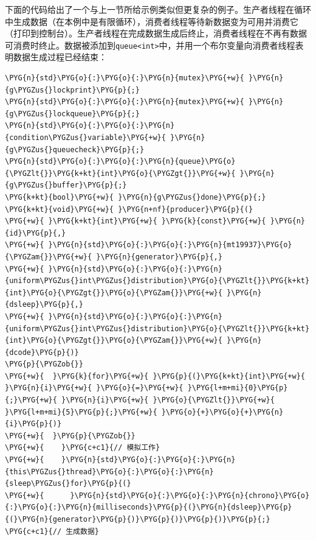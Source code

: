 
下面的代码给出了一个与上一节所给示例类似但更复杂的例子。生产者线程在循环中生成数据（在本例中是有限循环），消费者线程等待新数据变为可用并消费它（打印到控制台）。生产者线程在完成数据生成后终止，消费者线程在不再有数据可消费时终止。数据被添加到\texttt{queue<\allowbreak{}int>}中，并用一个布尔变量向消费者线程表明数据生成过程已经结束：



\begin{codeblockbg}
\begin{Verbatim}[commandchars=\\\{\},breaklines=true,breakanywhere=true,fontsize=\codefont,xleftmargin=17bp]
\PYG{n}{std}\PYG{o}{:}\PYG{o}{:}\PYG{n}{mutex}\PYG{+w}{ }\PYG{n}{g\PYGZus{}lockprint}\PYG{p}{;}
\PYG{n}{std}\PYG{o}{:}\PYG{o}{:}\PYG{n}{mutex}\PYG{+w}{ }\PYG{n}{g\PYGZus{}lockqueue}\PYG{p}{;}
\PYG{n}{std}\PYG{o}{:}\PYG{o}{:}\PYG{n}{condition\PYGZus{}variable}\PYG{+w}{ }\PYG{n}{g\PYGZus{}queuecheck}\PYG{p}{;}
\PYG{n}{std}\PYG{o}{:}\PYG{o}{:}\PYG{n}{queue}\PYG{o}{\PYGZlt{}}\PYG{k+kt}{int}\PYG{o}{\PYGZgt{}}\PYG{+w}{ }\PYG{n}{g\PYGZus{}buffer}\PYG{p}{;}
\PYG{k+kt}{bool}\PYG{+w}{ }\PYG{n}{g\PYGZus{}done}\PYG{p}{;}
\PYG{k+kt}{void}\PYG{+w}{ }\PYG{n+nf}{producer}\PYG{p}{(}
\PYG{+w}{ }\PYG{k+kt}{int}\PYG{+w}{ }\PYG{k}{const}\PYG{+w}{ }\PYG{n}{id}\PYG{p}{,}
\PYG{+w}{ }\PYG{n}{std}\PYG{o}{:}\PYG{o}{:}\PYG{n}{mt19937}\PYG{o}{\PYGZam{}}\PYG{+w}{ }\PYG{n}{generator}\PYG{p}{,}
\PYG{+w}{ }\PYG{n}{std}\PYG{o}{:}\PYG{o}{:}\PYG{n}{uniform\PYGZus{}int\PYGZus{}distribution}\PYG{o}{\PYGZlt{}}\PYG{k+kt}{int}\PYG{o}{\PYGZgt{}}\PYG{o}{\PYGZam{}}\PYG{+w}{ }\PYG{n}{dsleep}\PYG{p}{,}
\PYG{+w}{ }\PYG{n}{std}\PYG{o}{:}\PYG{o}{:}\PYG{n}{uniform\PYGZus{}int\PYGZus{}distribution}\PYG{o}{\PYGZlt{}}\PYG{k+kt}{int}\PYG{o}{\PYGZgt{}}\PYG{o}{\PYGZam{}}\PYG{+w}{ }\PYG{n}{dcode}\PYG{p}{)}
\PYG{p}{\PYGZob{}}
\PYG{+w}{  }\PYG{k}{for}\PYG{+w}{ }\PYG{p}{(}\PYG{k+kt}{int}\PYG{+w}{ }\PYG{n}{i}\PYG{+w}{ }\PYG{o}{=}\PYG{+w}{ }\PYG{l+m+mi}{0}\PYG{p}{;}\PYG{+w}{ }\PYG{n}{i}\PYG{+w}{ }\PYG{o}{\PYGZlt{}}\PYG{+w}{ }\PYG{l+m+mi}{5}\PYG{p}{;}\PYG{+w}{ }\PYG{o}{+}\PYG{o}{+}\PYG{n}{i}\PYG{p}{)}
\PYG{+w}{  }\PYG{p}{\PYGZob{}}
\PYG{+w}{    }\PYG{c+c1}{// 模拟工作}
\PYG{+w}{    }\PYG{n}{std}\PYG{o}{:}\PYG{o}{:}\PYG{n}{this\PYGZus{}thread}\PYG{o}{:}\PYG{o}{:}\PYG{n}{sleep\PYGZus{}for}\PYG{p}{(}
\PYG{+w}{      }\PYG{n}{std}\PYG{o}{:}\PYG{o}{:}\PYG{n}{chrono}\PYG{o}{:}\PYG{o}{:}\PYG{n}{milliseconds}\PYG{p}{(}\PYG{n}{dsleep}\PYG{p}{(}\PYG{n}{generator}\PYG{p}{)}\PYG{p}{)}\PYG{p}{)}\PYG{p}{;}
\PYG{c+c1}{// 生成数据}

\end{Verbatim}
\end{codeblockbg}
